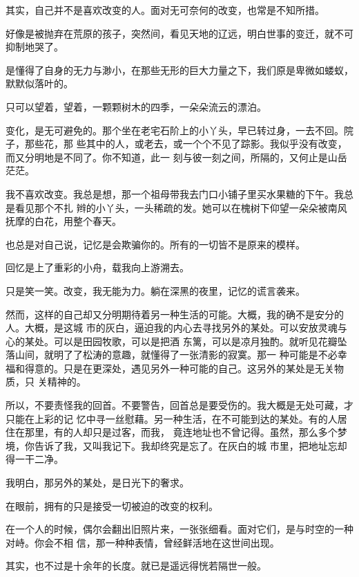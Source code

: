 \documentclass[12pt,a4paper]{article}
\begin{document}

		其实，自己并不是喜欢改变的人。面对无可奈何的改变，也常是不知所措。

		好像是被抛弃在荒原的孩子，突然间，看见天地的辽远，明白世事的变迁，就不可抑制地哭了。

		是懂得了自身的无力与渺小，在那些无形的巨大力量之下，我们原是卑微如蝼蚁，默默似落叶的。

		只可以望着，望着，一颗颗树木的四季，一朵朵流云的漂泊。

		变化，是无可避免的。那个坐在老宅石阶上的小丫头，早已转过身，一去不回。院子，那些花，那
	些其中的人，或老去，或一个个不见了踪影。我似乎没有改变，而又分明地是不同了。你不知道，此一
	刻与彼一刻之间，所隔的，又何止是山岳茫茫。

		我不喜欢改变。我总是想，那一个祖母带我去门口小铺子里买水果糖的下午。我总是看见那个不扎
	辫的小丫头，一头稀疏的发。她可以在槐树下仰望一朵朵被南风抚摩的白花，用整个春天。

		也总是对自己说，记忆是会欺骗你的。所有的一切皆不是原来的模样。

		回忆是上了重彩的小舟，载我向上游溯去。

		只是笑一笑。改变，我无能为力。躺在深黑的夜里，记忆的谎言袭来。

		然而，这样的自己却又分明期待着另一种生活的可能。大概，我的确不是安分的人。大概，是这城
	市的灰白，逼迫我的内心去寻找另外的某处。可以安放灵魂与心的某处。可以是田园牧歌，可以是把酒
	东篱，可以是凉月独酌。就听见花瓣坠落山间，就明了了松涛的意趣，就懂得了一张清影的寂寞。那一
	种可能是不必幸福和得意的。只是在更深处，遇见另外一种可能的自己。这另外的某处是无关物质，只
	关精神的。

		所以，不要责怪我的回首。不要警告，回首总是要受伤的。我大概是无处可藏，才只能在上彩的记
	忆中寻一丝慰藉。另一种生活，在不可能到达的某处。有的人居住在那里，有的人却只是过客，而我，
	竟连地址也不曾记得。虽然，那么多个梦境，你告诉了我，又叫我记下。我却终究是忘了。在灰白的城
	市里，把地址忘却得一干二净。

		我明白，那另外的某处，是日光下的奢求。

		在眼前，拥有的只是接受一切被迫的改变的权利。

	\endwriting



		在一个人的时候，偶尔会翻出旧照片来，一张张细看。面对它们，是与时空的一种对峙。你会不相
	信，那一种种表情，曾经鲜活地在这世间出现。

		其实，也不过是十余年的长度。就已是遥远得恍若隔世一般。
\end{document}
